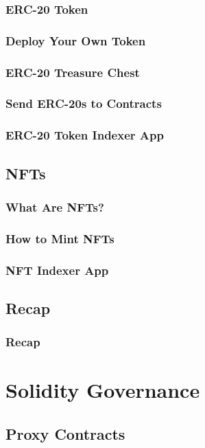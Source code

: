 \documentclass[a4paper, oneside]{book}
\begin{document}
\subsection{ERC-20 Token}
\subsection{Deploy Your Own Token}
\subsection{ERC-20 Treasure Chest}
\subsection{Send ERC-20s to Contracts}
\subsection{ERC-20 Token Indexer App}

\section{NFTs}
\subsection{What Are NFTs?}
\subsection{How to Mint NFTs}
\subsection{NFT Indexer App}

\section{Recap}
\subsection{Recap}


\chapter{Solidity Governance}


\section{Proxy Contracts}
\end{document}
